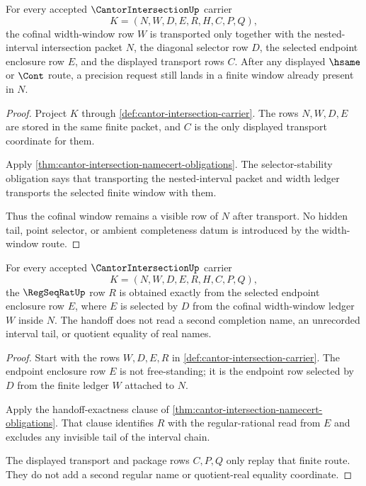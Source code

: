 \begin{theorem}
\label{thm:cantor-intersection-width-window-transport}
For every accepted $\CantorIntersectionUp$ carrier
$$
K=(N,W,D,E,R,H,C,P,Q),
$$
the cofinal width-window row $W$ is transported only together with the nested-interval intersection packet $N$, the diagonal selector row $D$, the selected endpoint enclosure row $E$, and the displayed transport rows $C$. After any displayed $\hsame$ or $\Cont$ route, a precision request still lands in a finite window already present in $N$.
\end{theorem}
\begin{proof}
Project $K$ through \autoref{def:cantor-intersection-carrier}. The rows $N,W,D,E$ are stored in the same finite packet, and $C$ is the only displayed transport coordinate for them.

Apply \autoref{thm:cantor-intersection-namecert-obligations}. The selector-stability obligation says that transporting the nested-interval packet and width ledger transports the selected finite window with them.

Thus the cofinal window remains a visible row of $N$ after transport. No hidden tail, point selector, or ambient completeness datum is introduced by the width-window route.
\end{proof}

\begin{theorem}
\label{thm:cantor-intersection-regseqrat-handoff-exactness}
For every accepted $\CantorIntersectionUp$ carrier
$$
K=(N,W,D,E,R,H,C,P,Q),
$$
the $\RegSeqRatUp$ row $R$ is obtained exactly from the selected endpoint enclosure row $E$, where $E$ is selected by $D$ from the cofinal width-window ledger $W$ inside $N$. The handoff does not read a second completion name, an unrecorded interval tail, or quotient equality of real names.
\end{theorem}
\begin{proof}
Start with the rows $W,D,E,R$ in \autoref{def:cantor-intersection-carrier}. The endpoint enclosure row $E$ is not free-standing; it is the endpoint row selected by $D$ from the finite ledger $W$ attached to $N$.

Apply the handoff-exactness clause of \autoref{thm:cantor-intersection-namecert-obligations}. That clause identifies $R$ with the regular-rational read from $E$ and excludes any invisible tail of the interval chain.

The displayed transport and package rows $C,P,Q$ only replay that finite route. They do not add a second regular name or quotient-real equality coordinate.
\end{proof}

